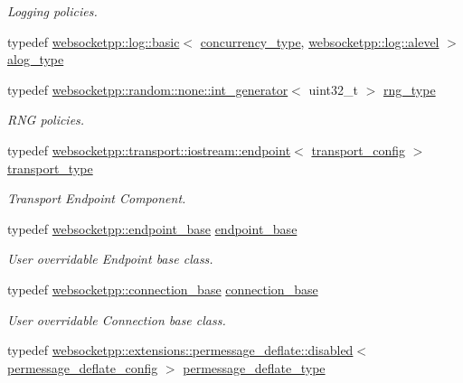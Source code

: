\begin{DoxyCompactItemize}
\begin{DoxyCompactList}\small\item\em Logging policies. \end{DoxyCompactList}\item 
typedef \hyperlink{classwebsocketpp_1_1log_1_1basic}{websocketpp\+::log\+::basic}$<$ \hyperlink{structwebsocketpp_1_1config_1_1core_a894e9dea6f10e890ea21a687607c2f70}{concurrency\+\_\+type}, \hyperlink{structwebsocketpp_1_1log_1_1alevel}{websocketpp\+::log\+::alevel} $>$ \hyperlink{structwebsocketpp_1_1config_1_1core_a3b2c116aa4077f10b085f008b48028e2}{alog\+\_\+type}
\item 
typedef \hyperlink{classwebsocketpp_1_1random_1_1none_1_1int__generator}{websocketpp\+::random\+::none\+::int\+\_\+generator}$<$ uint32\+\_\+t $>$ \hyperlink{structwebsocketpp_1_1config_1_1core_a245db33d05f7994d221db66f506ab8c6}{rng\+\_\+type}
\begin{DoxyCompactList}\small\item\em R\+N\+G policies. \end{DoxyCompactList}\item 
typedef \hyperlink{classwebsocketpp_1_1transport_1_1iostream_1_1endpoint}{websocketpp\+::transport\+::iostream\+::endpoint}$<$ \hyperlink{structwebsocketpp_1_1config_1_1core_1_1transport__config}{transport\+\_\+config} $>$ \hyperlink{structwebsocketpp_1_1config_1_1core_a378afa38a0e66a4d9a1a865ad1b2d13d}{transport\+\_\+type}
\begin{DoxyCompactList}\small\item\em Transport Endpoint Component. \end{DoxyCompactList}\item 
typedef \hyperlink{classwebsocketpp_1_1endpoint__base}{websocketpp\+::endpoint\+\_\+base} \hyperlink{structwebsocketpp_1_1config_1_1core_a5389422816ef3115fb8b7f4cd92d5ca3}{endpoint\+\_\+base}
\begin{DoxyCompactList}\small\item\em User overridable Endpoint base class. \end{DoxyCompactList}\item 
typedef \hyperlink{classwebsocketpp_1_1connection__base}{websocketpp\+::connection\+\_\+base} \hyperlink{structwebsocketpp_1_1config_1_1core_a8e35ea7d03ba80347094fd53e1cac178}{connection\+\_\+base}
\begin{DoxyCompactList}\small\item\em User overridable Connection base class. \end{DoxyCompactList}\item 
typedef \hyperlink{classwebsocketpp_1_1extensions_1_1permessage__deflate_1_1disabled}{websocketpp\+::extensions\+::permessage\+\_\+deflate\+::disabled}$<$ \hyperlink{structwebsocketpp_1_1config_1_1core_1_1permessage__deflate__config}{permessage\+\_\+deflate\+\_\+config} $>$ \hyperlink{structwebsocketpp_1_1config_1_1core_a563c271682eaf48c114f0efca4072c3f}{permessage\+\_\+deflate\+\_\+type}
\end{DoxyCompactItemize}
